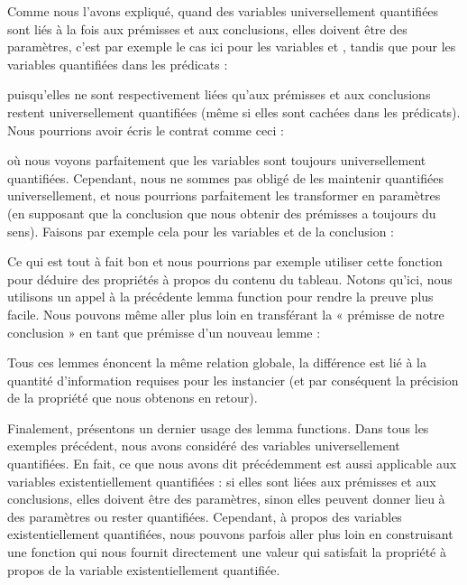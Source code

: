 Comme nous l'avons expliqué, quand des variables universellement quantifiées
sont liés à la fois aux prémisses et aux conclusions, elles doivent être des
paramètres, c'est par exemple le cas ici pour les variables 
et , tandis que pour les variables quantifiées dans les
prédicats :





puisqu'elles ne sont respectivement liées qu'aux prémisses et aux conclusions
restent universellement quantifiées (même si elles sont cachées dans les
prédicats). Nous pourrions avoir écris le contrat comme ceci :





où nous voyons parfaitement que les variables sont toujours universellement
quantifiées. Cependant, nous ne sommes pas obligé de les maintenir quantifiées
universellement, et nous pourrions parfaitement les transformer en paramètres
(en supposant que la conclusion que nous obtenir des prémisses a toujours du
sens). Faisons par exemple cela pour les variables  et
 de la conclusion :




Ce qui est tout à fait bon et nous pourrions par exemple utiliser cette fonction
pour déduire des propriétés à propos du contenu du tableau. Notons qu'ici, nous
utilisons un appel à la précédente lemma function pour rendre la preuve plus
facile. Nous pouvons même aller plus loin en transférant la « prémisse de notre
conclusion » en tant que prémisse d'un nouveau lemme :





Tous ces lemmes énoncent la même relation globale, la différence est lié à la
quantité d'information requises pour les instancier (et par conséquent la 
précision de la propriété que nous obtenons en retour).


Finalement, présentons un dernier usage des lemma functions. Dans tous les 
exemples précédent, nous avons considéré des variables universellement quantifiées.
En fait, ce que nous avons dit précédemment est aussi applicable aux variables
existentiellement quantifiées : si elles sont liées aux prémisses et aux
conclusions, elles doivent être des paramètres, sinon elles peuvent donner lieu
à des paramètres ou rester quantifiées. Cependant, à propos des variables
existentiellement quantifiées, nous pouvons parfois aller plus loin en construisant
une fonction qui nous fournit directement une valeur qui satisfait la propriété
à propos de la variable existentiellement quantifiée.



